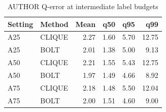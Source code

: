 \begin{table}[H]
\centering
\small
\setlength{\tabcolsep}{5pt}
\caption{AUTHOR Q-error at intermediate label budgets}
\label{tab:supplement-AUTHOR}
\begin{tabular}{@{}llrrrr@{}}
\toprule
Setting & Method & Mean & q50 & q95 & q99 \\
\midrule
A25 & CLIQUE & 2.27 & 1.60 & 5.70 & 12.75 \\
A25 & BOLT & 2.01 & 1.38 & 5.00 & 9.13 \\
A50 & CLIQUE & 2.21 & 1.55 & 5.43 & 12.75 \\
A50 & BOLT & 1.97 & 1.49 & 4.66 & 8.92 \\
A75 & CLIQUE & 2.18 & 1.48 & 5.50 & 12.04 \\
A75 & BOLT & 2.00 & 1.51 & 4.60 & 9.00 \\
\bottomrule
\end{tabular}
\end{table}
